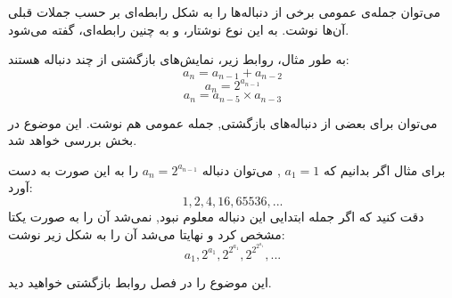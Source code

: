 
\begin{DEFINITION}
    \p
    می‌توان جمله‌ی عمومی برخی از دنباله‌ها را به شکل رابطه‌ای بر حسب جملات قبلی آن‌ها نوشت.
    به این نوع نوشتار،
    و به چنین رابطه‌ای،
    گفته می‌شود.
\end{DEFINITION}

\p
به طور مثال، روابط زیر، نمایش‌های بازگشتی از چند دنباله هستند:
$$a_n=a_{n-1}+a_{n-2}$$
$$a_n=2^{a_{n-1}}$$
$$a_n=a_{n-5}\times a_{n-3}$$

\p
می‌توان برای بعضی از دنباله‌های بازگشتی, جمله عمومی هم نوشت. این موضوع در بخش  بررسی خواهد شد.

\p
برای مثال اگر بدانیم که 
$a_1=1$
,
می‌توان دنباله
$a_n=2^{a_{n-1}}$
را به این صورت به دست آورد:
\[1,2,4,16,65536,...\]
دقت کنید که اگر جمله ابتدایی این دنباله معلوم نبود, نمی‌شد آن را به صورت یکتا مشخص کرد و نهایتا می‌شد آن را به شکل زیر نوشت:
\[a_1,2^{a_1},2^{2^{a_1}},2^{2^{2^{a_1}}},...\]




 این موضوع را در فصل روابط بازگشتی خواهید دید.







